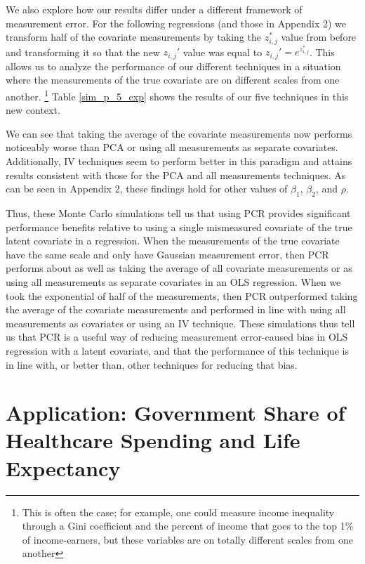 \documentclass[10pt]{article}
\begin{document}
We also explore how our results differ under a different framework of measurement error. For the following regressions (and those in Appendix 2) we transform half of the covariate measurements by taking the $z_{i,j}^*$ value from before and transforming it so that the new $z_{i,j}'$ value was equal to $z_{i,j}' = e^{z_{i,j}^*}$. This allows us to analyze the performance of our different techniques in a situation where the measurements of the true covariate are on different scales from one another. \footnote{This is often the case; for example, one could measure income inequality through a Gini coefficient and the percent of income that goes to the top 1\% of income-earners, but these variables are on totally different scales from one another} Table \ref{sim_p_5_exp} shows the results of our five techniques in this new context.



We can see that taking the average of the covariate measurements now performs noticeably worse than PCA or using all measurements as separate covariates. Additionally, IV techniques seem to perform better in this paradigm and attains results consistent with those for the PCA and all measurements techniques. As can be seen in Appendix 2, these findings hold for other values of $\beta_1$, $\beta_2$, and $\rho$.

Thus, these Monte Carlo simulations tell us that using PCR provides significant performance benefits relative to using a single mismeasured covariate of the true latent covariate in a regression. When the measurements of the true covariate have the same scale and only have Gaussian measurement error, then PCR performs about as well as taking the average of all covariate measurements or as using all measurements as separate covariates in an OLS regression. When we took the exponential of half of the measurements, then PCR outperformed taking the average of the covariate measurements and performed in line with using all measurements as covariates or using an IV technique. These simulations thus tell us that PCR is a useful way of reducing measurement error-caused bias in OLS regression with a latent covariate, and that the performance of this technique is in line with, or better than, other techniques for reducing that bias.

    \section*{Application: Government Share of Healthcare Spending and Life Expectancy}
\end{document}
